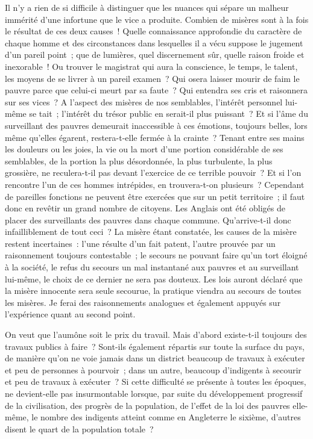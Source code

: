 \documentclass[twoside]{book} %
\begin{document}
Il n’y a rien de si difficile à distinguer que les nuances qui sépare un malheur immérité d’une infortune que le vice a produite. Combien de misères sont à la fois le résultat de ces deux causes ! Quelle connaissance approfondie du caractère de chaque homme et des circonstances dans lesquelles il a vécu suppose le jugement d’un pareil point ; que de lumières, quel discernement sûr, quelle raison froide et inexorable ! Ou trouver le magistrat qui aura la conscience, le temps, le talent, les moyens de se livrer à un pareil examen ? Qui osera laisser mourir de faim le pauvre parce que celui-ci meurt par sa faute ? Qui entendra ses cris et raisonnera sur ses vices ? A l’aspect des misères de nos semblables, l’intérêt personnel lui-même se tait ; l’intérêt du trésor public en serait-il plus puissant ? Et si l’âme du surveillant des pauvres demeurait inaccessible à ces émotions, toujours belles, lors même qu’elles égarent, restera-t-elle fermée à la crainte ? Tenant entre ses mains les douleurs ou les joies, la vie ou la mort d’une portion considérable de ses semblables, de la portion la plus désordonnée, la plus turbulente, la plus grossière, ne reculera-t-il pas devant l’exercice de ce terrible pouvoir ? Et si l’on rencontre l’un de ces hommes intrépides, en trouvera-t-on plusieurs ? Cependant de pareilles fonctions ne peuvent être exercées que sur un petit territoire ; il faut donc en revêtir un grand nombre de citoyens. Les Anglais ont été obligés de placer des surveillants des pauvres dans chaque commune. Qu'arrive-t-il donc infailliblement de tout ceci ? La misère étant constatée, les causes de la misère restent incertaines : l’une résulte d’un fait patent, l’autre prouvée par un raisonnement toujours contestable ; le secours ne pouvant faire qu’un tort éloigné à la société, le refus du secours un mal instantané aux pauvres et au surveillant lui-même, le choix de ce dernier ne sera pas douteux. Les lois auront déclaré que la misère innocente sera seule secourue, la pratique viendra au secours de toutes les misères. Je ferai des raisonnements analogues et également appuyés sur l’expérience quant au second point.\par
\bigbreak
\noindent On veut que l’aumône soit le prix du travail. Mais d’abord existe-t-il toujours des travaux publics à faire ? Sont-ils également répartis sur toute la surface du pays, de manière qu’on ne voie jamais dans un district beaucoup de travaux à exécuter et peu de personnes à pourvoir ; dans un autre, beaucoup d’indigents à secourir et peu de travaux à exécuter ? Si cette difficulté se présente à toutes les époques, ne devient-elle pas insurmontable lorsque, par suite du développement progressif de la civilisation, des progrès de la population, de l’effet de la loi des pauvres elle-même, le nombre des indigents atteint comme en Angleterre le sixième, d’autres disent le quart de la population totale ?\par
\end{document}

